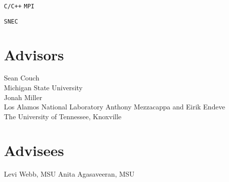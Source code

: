 \documentclass[letterpaper]{deedy-resume} %
\begin{document}
\begin{minipage}[t]{0.36\textwidth}

\texttt{C/C++} \textbullet{} \FORTRAN \textbullet{} \Python \textbullet{} \Julia \textbullet{} \Kokkos \textbullet{} \texttt{MPI}

\sectionspace %


\phoebus \textbullet{} \FLASH \textbullet{} \thornado \textbullet{} \texttt{SNEC}
\sectionspace %


\section{Advisors}
Sean Couch \\
Michigan State University \\
Jonah Miller \\
Los Alamos National Laboratory
Anthony Mezzacappa and Eirik Endeve\\
The University of Tennessee, Knoxville

\section{Advisees}
Levi Webb, MSU
Anita Agasaveeran, MSU

\sectionspace %


\end{minipage} %
\hfill
%
%
\end{document}
